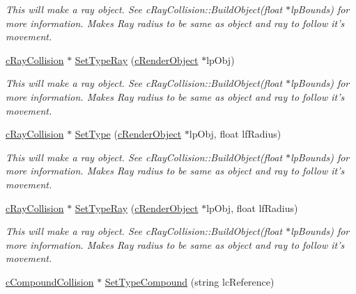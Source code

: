 \begin{DoxyCompactItemize}
\begin{DoxyCompactList}\small\item\em This will make a ray object. See cRayCollision::BuildObject(float $\ast$lpBounds) for more information. Makes Ray radius to be same as object and ray to follow it's movement. \end{DoxyCompactList}\item 
\hypertarget{classc_collision_object_ac28c6d5fff668bb3429de93909dd643d}{
\hyperlink{classc_ray_collision}{cRayCollision} $\ast$ \hyperlink{classc_collision_object_ac28c6d5fff668bb3429de93909dd643d}{SetTypeRay} (\hyperlink{classc_render_object}{cRenderObject} $\ast$lpObj)}
\label{classc_collision_object_ac28c6d5fff668bb3429de93909dd643d}

\begin{DoxyCompactList}\small\item\em This will make a ray object. See cRayCollision::BuildObject(float $\ast$lpBounds) for more information. Makes Ray radius to be same as object and ray to follow it's movement. \end{DoxyCompactList}\item 
\hypertarget{classc_collision_object_af6fc6d835d646b55c36ccf0e62630cee}{
\hyperlink{classc_ray_collision}{cRayCollision} $\ast$ \hyperlink{classc_collision_object_af6fc6d835d646b55c36ccf0e62630cee}{SetType} (\hyperlink{classc_render_object}{cRenderObject} $\ast$lpObj, float lfRadius)}
\label{classc_collision_object_af6fc6d835d646b55c36ccf0e62630cee}

\begin{DoxyCompactList}\small\item\em This will make a ray object. See cRayCollision::BuildObject(float $\ast$lpBounds) for more information. Makes Ray radius to be same as object and ray to follow it's movement. \end{DoxyCompactList}\item 
\hypertarget{classc_collision_object_a5e8f0b107345d7c03169d92eded17f87}{
\hyperlink{classc_ray_collision}{cRayCollision} $\ast$ \hyperlink{classc_collision_object_a5e8f0b107345d7c03169d92eded17f87}{SetTypeRay} (\hyperlink{classc_render_object}{cRenderObject} $\ast$lpObj, float lfRadius)}
\label{classc_collision_object_a5e8f0b107345d7c03169d92eded17f87}

\begin{DoxyCompactList}\small\item\em This will make a ray object. See cRayCollision::BuildObject(float $\ast$lpBounds) for more information. Makes Ray radius to be same as object and ray to follow it's movement. \end{DoxyCompactList}\item 
\hypertarget{classc_collision_object_a647e170fc428c65d2795658ec737dee0}{
\hyperlink{classc_compound_collision}{cCompoundCollision} $\ast$ \hyperlink{classc_collision_object_a647e170fc428c65d2795658ec737dee0}{SetTypeCompound} (string lcReference)}
\label{classc_collision_object_a647e170fc428c65d2795658ec737dee0}


\end{DoxyCompactItemize}

